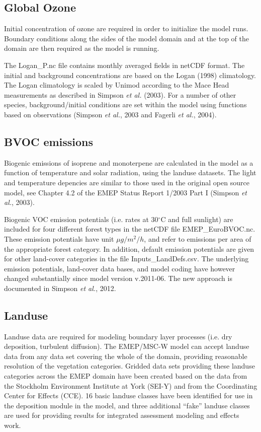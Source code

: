 \subsection{Global Ozone}
Initial concentration of ozone are required in order to
initialize the model runs. Boundary conditions along the sides of the model
domain and at the top of the domain are then required as the model is
running.

The Logan\_P.nc file contains monthly averaged fields in netCDF format. 
The initial and background
concentrations are based on the Logan (1998) climatology. The Logan
climatology is scaled by Unimod according to the Mace Head measurements as
described in Simpson {\sl et al.} (2003). For a number of other species, 
background/initial conditions are set within the model using functions 
based on observations (Simpson {\sl et al.}, 2003 and Fagerli {\sl et al.}, 2004).

\subsection{BVOC emissions}
Biogenic emissions of isoprene and monoterpene are calculated in the
model as a function of temperature and solar radiation, using the landuse
datasets. The light and temperature depencies are similar to those
used in the original open source model, see 
Chapter 4.2 of the EMEP Status Report 1/2003 Part I (Simpson
{\sl et al.}, 2003).

Biogenic VOC emission potentials (i.e. rates at 30$^\circ$C and full sunlight)
are included for four different forest types in the netCDF file 
EMEP\_EuroBVOC.nc. These emission potentials have unit $\mu g/m^{2} /h$, and
refer to emissions per area of the appropriate forest category. In 
addition, default emission potentials are given for other
land-cover categories in the file Inputs\_LandDefs.csv. 
The underlying emission potentials, land-cover data bases, and model
coding have however changed substantially since model version v.2011-06. The new approach
is documented in Simpson {\sl et al.}, 2012.

\subsection{Landuse}

Landuse data are required for modeling boundary layer processes
(i.e. dry deposition, turbulent diffusion).
The EMEP/MSC-W model can accept landuse data from any
data set covering the whole of the domain, providing reasonable 
resolution of the vegetation categories. Gridded data sets providing
these landuse categories across the EMEP domain have been created
based on the data from the Stockholm Environment Institute at York 
(SEI-Y) and from the Coordinating Center for Effects (CCE). 
16 basic landuse classes have been identified for use in the
deposition module in the model, and three additional ``fake'' landuse
classes are used for providing results for integrated assessment
modeling and effects work.

